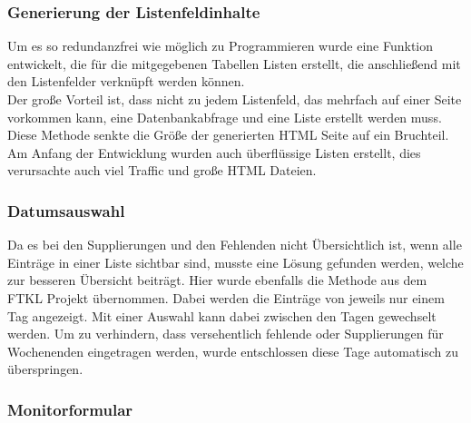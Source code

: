 \subsubsection{Generierung der Listenfeldinhalte}
Um es so redundanzfrei wie möglich zu Programmieren wurde eine Funktion entwickelt, die für die mitgegebenen Tabellen Listen erstellt, die anschließend mit den Listenfelder verknüpft werden können.\\
Der große Vorteil ist, dass nicht zu jedem Listenfeld, das mehrfach auf einer Seite vorkommen kann, eine Datenbankabfrage und eine Liste erstellt werden muss. Diese Methode senkte die Größe der generierten HTML Seite auf ein Bruchteil. Am Anfang der Entwicklung wurden auch überflüssige Listen erstellt, dies verursachte auch viel Traffic und große HTML Dateien.
\subsubsection{Datumsauswahl}
Da es bei den Supplierungen und den Fehlenden nicht Übersichtlich ist, wenn alle Einträge in einer Liste sichtbar sind, musste eine Lösung gefunden werden, welche zur besseren Übersicht beiträgt. Hier wurde ebenfalls die Methode aus dem FTKL Projekt übernommen. Dabei werden die Einträge von jeweils nur einem Tag angezeigt. Mit einer Auswahl kann dabei zwischen den Tagen gewechselt werden. Um zu verhindern, dass versehentlich fehlende oder Supplierungen für Wochenenden eingetragen werden, wurde entschlossen diese Tage automatisch zu überspringen.
\subsubsection{Monitorformular}
